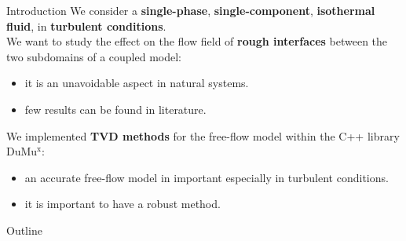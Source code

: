 \documentclass{beamer}
\newcommand{\DUMUX}{DuMu$^\text{x}$\xspace} %
\begin{document}
%
\begin{frame}{Introduction}
We consider a \textbf{single-phase}, \textbf{single-component}, 
\textbf{isothermal fluid}, in \textbf{turbulent conditions}.\\
\vspace{0.3cm}
We want to study the effect on the flow field of \textbf{rough interfaces} 
between the two 
subdomains of a coupled model:
\begin{itemize}
	\item it is an unavoidable aspect in natural systems.
	\item few results can be found in literature.
\end{itemize}
\vspace{0.3cm}
We implemented \textbf{TVD methods} for the free-flow model within the 
C++ library \DUMUX:
\begin{itemize}
	\item an accurate free-flow model in important especially in turbulent 
	conditions.
	\item it is important to have a robust method.
\end{itemize}
\end{frame}
\begin{frame}{Outline}
	\tableofcontents
\end{frame}
\end{document}
